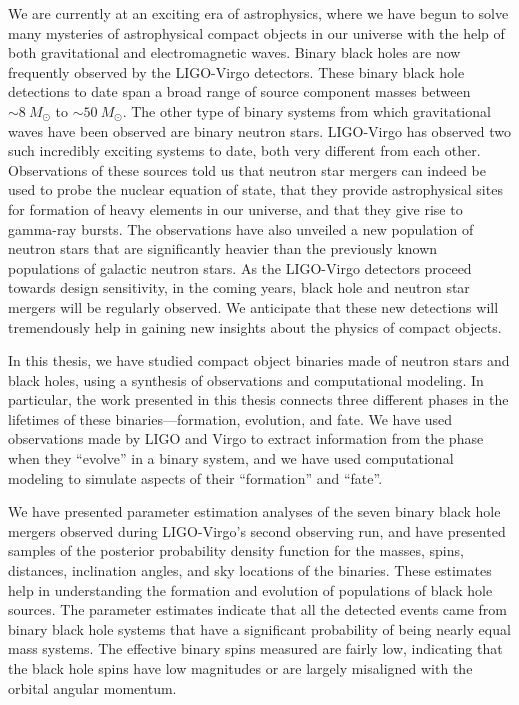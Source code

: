 We are currently at an exciting era of astrophysics, where we have begun to solve many mysteries of astrophysical compact objects in our universe with the help of both gravitational and electromagnetic waves. Binary black holes are now frequently observed by the LIGO-Virgo detectors. These binary black hole detections to date span a broad range of source component masses between $\sim 8~M_\odot$ to $\sim 50~M_\odot$. The other type of binary systems from which gravitational waves have been observed are binary neutron stars. LIGO-Virgo has observed two such incredibly exciting systems to date, both very different from each other. Observations of these sources told us that neutron star mergers can indeed be used to probe the nuclear equation of state, that they provide astrophysical sites for formation of heavy elements in our universe, and that they give rise to gamma-ray bursts. The observations have also unveiled a new population of neutron stars that are significantly heavier than the previously known populations of galactic neutron stars. As the LIGO-Virgo detectors proceed towards design sensitivity, in the coming years, black hole and neutron star mergers will be regularly observed. We anticipate that these new detections will tremendously help in gaining new insights about the physics of compact objects.

In this thesis, we have studied compact object binaries made of neutron stars and black holes, using a synthesis of observations and computational modeling. In particular, the work presented in this thesis connects three different phases in the lifetimes of these binaries---formation, evolution, and fate. We have used observations made by LIGO and Virgo to extract information from the phase when they ``evolve'' in a binary system, and we have used computational modeling to simulate aspects of their ``formation'' and ``fate''.

We have presented parameter estimation analyses of the seven binary black hole mergers observed during LIGO-Virgo's second observing run, and have presented samples of the posterior probability density function for the masses, spins, distances, inclination angles, and sky locations of the binaries. These estimates help in understanding the formation and evolution of populations of black hole sources. The parameter estimates indicate that all the detected events came from binary black hole systems that have a significant probability of being nearly equal mass systems. The effective binary spins measured are fairly low, indicating that the black hole spins have low magnitudes or are largely misaligned with the orbital angular momentum.

